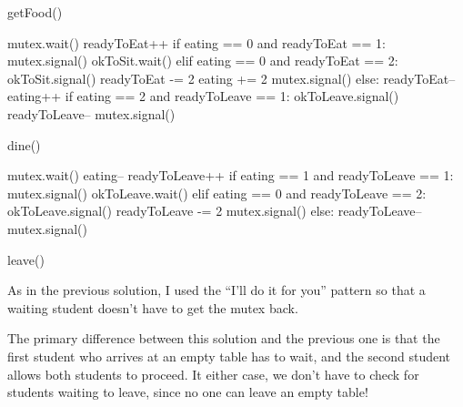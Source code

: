 \documentclass{book}
\begin{document}
\begin{unbreakable}[title={Extended Dining Hall problem solution}]{}
getFood()

mutex.wait()
readyToEat++
if eating == 0 and readyToEat == 1:
    mutex.signal()
    okToSit.wait()
elif eating == 0 and readyToEat == 2:
    okToSit.signal()
    readyToEat -= 2
    eating += 2
    mutex.signal()
else:
    readyToEat--
    eating++
    if eating == 2 and readyToLeave == 1:
        okToLeave.signal()
        readyToLeave--
    mutex.signal()

dine()

mutex.wait()
eating--
readyToLeave++
if eating == 1 and readyToLeave == 1:
    mutex.signal()
    okToLeave.wait()
elif eating == 0 and readyToLeave == 2:
    okToLeave.signal()
    readyToLeave -= 2
    mutex.signal()
else:
    readyToLeave--
    mutex.signal()

leave()
\end{unbreakable}

As in the previous solution, I used the ``I'll do it for you''
pattern so that a waiting student doesn't have to get the mutex
back.

The primary difference between this solution and the previous
one is that the first student who arrives at an empty table
has to wait, and the second student allows both students to
proceed.  It either case, we don't have to check for students
waiting to leave, since no one can leave an empty table!



%


%


%

\end{document}

